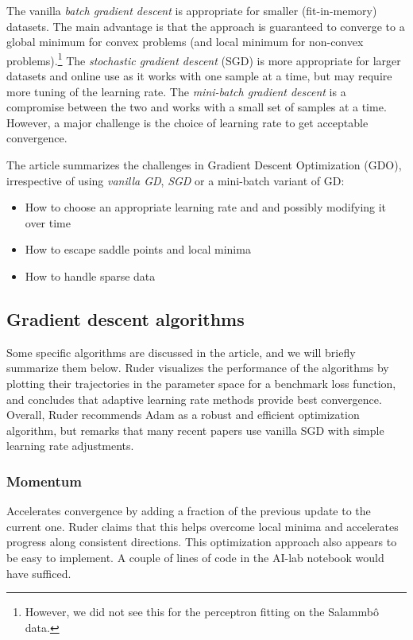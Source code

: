 \documentclass[a4paper]{article}
\begin{document}

The vanilla \emph{batch gradient descent} is appropriate for smaller (fit-in-memory) datasets. The main advantage is that the approach is guaranteed to converge to a global minimum for convex problems (and local minimum for non-convex problems).\footnote{However, we did not see this for the perceptron fitting on the Salammbô data.} The \emph{stochastic gradient descent} (SGD) is more appropriate for larger datasets and online use as it works with one sample at a time, but may require more tuning of the learning rate. The \emph{mini-batch gradient descent} is a compromise between the two and works with a small set of samples at a time. However, a major challenge is the choice of learning rate to get acceptable convergence.
  

The article summarizes the challenges in Gradient Descent Optimization (GDO), irrespective of using \emph{vanilla GD}, \emph{SGD} or a mini-batch variant of GD:
\begin{itemize}
    \item How to choose an appropriate learning rate and and possibly modifying it over time
    \item  How to escape saddle points and local minima
    \item  How to handle sparse data
\end{itemize}

\subsection{Gradient descent algorithms}
Some specific algorithms are discussed in the article, and we will briefly summarize them below. Ruder visualizes the performance of the algorithms by plotting their trajectories in the parameter space for a benchmark loss function, and concludes that adaptive learning rate methods provide best convergence. Overall, Ruder recommends Adam as a robust and efficient optimization algorithm, but remarks that many recent papers use vanilla SGD with simple learning rate adjustments.

\subsubsection{Momentum}
Accelerates convergence by adding a fraction of the previous update to the current one.
Ruder claims that this helps overcome local minima and accelerates progress along consistent directions. This optimization approach also appears to be easy to implement.
A couple of lines of code in the AI-lab notebook would have sufficed.
\end{document}
